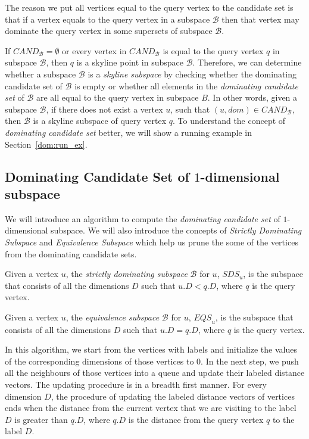 The reason we put all vertices equal to the query vertex to the candidate set is that if a vertex equals to the query vertex in a subspace $\mathcal{B}$ then that vertex may dominate the query vertex in some supersets of subspace $\mathcal{B}$. 

If $\mathit{CAND}_\mathcal{B} = \emptyset$ or every vertex in $\mathit{CAND}_\mathcal{B}$ is equal to the query vertex $q$ in subspace $\mathcal{B}$, then $q$ is a skyline point in subspace $\mathcal{B}$. Therefore, we can determine whether a subspace $\mathcal{B}$ is a \emph{skyline subspace} by checking whether the dominating candidate set of $\mathcal{B}$ is empty or whether all elements in the \emph{dominating candidate set} of $\mathcal{B}$ are all equal to the query vertex in subspace $B$. In other words, given a subspace $\mathcal{B}$, if there does not exist a vertex $u$, such that $(u, dom) \in \mathit{CAND}_\mathcal{B}$, then $\mathcal{B}$ is a skyline subspace of query vertex $q$. To understand the concept of \emph{dominating candidate set} better, we will show a running example in Section~\ref{dom:run_ex}.

\subsection{Dominating Candidate Set of $1$-dimensional subspace}

We will introduce an algorithm to compute the \emph{dominating candidate set} of $1$-dimensional subspace. We will also introduce the concepts of \emph{Strictly Dominating Subspace} and \emph{Equivalence Subspace} which help us prune the some of the vertices from the dominating candidate sets.

\begin{definition}
Given a vertex $u$, the \emph{strictly dominating subspace} $\mathcal{B}$ for $u$, $\mathit{SDS}_u$, is the subspace that consists of all the dimensions $D$ such that $u.D < q.D$, where $q$ is the query vertex.
\end{definition}

\begin{definition}
Given a vertex $u$, the \emph{equivalence subspace} $\mathcal{B}$ for $u$, $\mathit{EQS}_u$, is the subspace that consists of all the dimensions $D$ such that $u.D = q.D$, where $q$ is the query vertex.
\end{definition}

In this algorithm, we start from the vertices with labels and initialize the values of the corresponding dimensions of those vertices to $0$. In the next step, we push all the neighbours of those vertices into a queue and update their labeled distance vectors. The updating procedure is in a breadth first manner. For every dimension $D$, the procedure of updating the labeled distance vectors of vertices ends when the distance from the current vertex that we are visiting to the label $D$ is greater than $q.D$, where $q.D$ is the distance from the query vertex $q$ to the label $D$.

